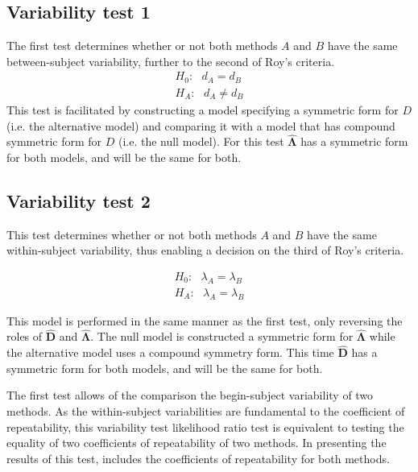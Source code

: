 \documentclass[12pt, a4paper]{report}
\theoremstyle{plain}
\theoremstyle{definition}
\theoremstyle{remark}
\begin{document}
	

	

	\subsection{Variability test 1}
	The first test determines whether or not both methods $A$ and $B$ have the same between-subject variability, further to the second of Roy's criteria.
	\begin{eqnarray*}
		H_{0}: \mbox{ }d_{A}  = d_{B} \\
		H_{A}: \mbox{ }d_{A}  \neq d_{B}
	\end{eqnarray*}
	This test is facilitated by constructing a model specifying a symmetric form for $D$ (i.e. the alternative model) and comparing it with a model that has compound symmetric form for $D$ (i.e. the null model). For this test $\boldsymbol{\hat{\Lambda}}$ has a symmetric form for both models, and will be the same for both.
	

	
	
	\subsection{Variability test 2}
	
	This test determines whether or not both methods $A$ and $B$ have the same within-subject variability, thus enabling a decision on the third of Roy's criteria.
	
	\begin{eqnarray*}
		H_{0}: \mbox{ }\lambda_{A}  = \lambda_{B} \\
		H_{A}: \mbox{ }\lambda_{A}  = \lambda_{B}
	\end{eqnarray*}
	
	This model is performed in the same manner as the first test, only reversing the roles of $\boldsymbol{\hat{D}}$ and $\boldsymbol{\hat{\Lambda}}$. The null model is constructed a symmetric form for $\boldsymbol{\hat{\Lambda}}$ while the alternative model uses a compound symmetry form. This time $\boldsymbol{\hat{D}}$ has a symmetric form for both models, and will be the same for both.
	
	The first test allows of the comparison the begin-subject variability of two methods. As the within-subject variabilities are fundamental to the coefficient of repeatability, this variability test likelihood ratio test is equivalent to testing the equality of two coefficients of repeatability of two methods. In presenting the results of this test, \citet{roy} includes the coefficients of repeatability for both methods.
	
\end{document}
